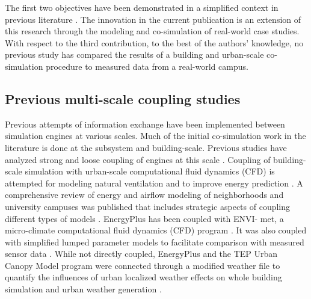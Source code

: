 \documentclass{tBPS2e}
\theoremstyle{plain}
\theoremstyle{definition}
\theoremstyle{remark}
\newcommand{\noteDT}[1]{\footnote{\textcolor{green}{#1}}}
\begin{document}

The first two objectives have been demonstrated in a simplified context in
previous literature \citep{thomas2014multiscale,Miller:2015vk}. The innovation
in the current publication is an extension of this research through the
modeling and co-simulation of real-world case studies. With respect to the
third contribution, to the best of the authors' knowledge, no previous study
has compared the results of a building and urban-scale co-simulation procedure
to measured data from a real-world campus.%

\subsection{Previous multi-scale coupling studies}
Previous attempts of information exchange have been implemented between
simulation engines at various scales. Much of the initial co-simulation work
in the literature is done at the subsystem and building-scale. Previous studies
have analyzed strong and loose coupling of engines at this scale
\citep{Trcka:2010cr,Wetter:2011kh}. Coupling of building-scale simulation with
urban-scale computational fluid dynamics (CFD) is attempted for modeling
natural ventilation \citep{Zhang:2013vx} and to improve energy prediction
\citep{Bouyer:2011eha}. A comprehensive review of energy and airflow modeling
of neighborhoods and university campuses was published that includes
strategic aspects of coupling different %
types of models \citep{Srebric:2015gq}. EnergyPlus has been coupled with ENVI-
met, a micro-climate computational fluid dynamics (CFD) program
\citep{Yang:2012cr}. It was also coupled with simplified lumped parameter
models to facilitate comparison with measured sensor data
\citep{Martin:2015fj}. While not directly coupled, EnergyPlus and the TEP Urban Canopy Model program were connected
through a modified weather file to quantify the influences of urban localized weather effects
on whole building simulation \citep{Bueno:2011hi} and urban weather generation
\citep{Bueno:2013hh}.
\end{document}
